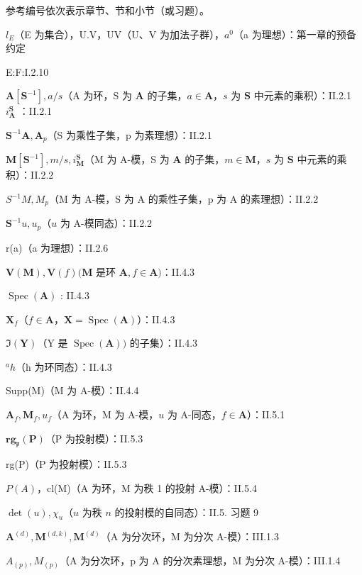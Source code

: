 
参考编号依次表示章节、节和小节（或习题）。

\(l_{E}\)（E 为集合），U.V，UV（U、V 为加法子群），\(a^{0}\)（a 为理想）：第一章的预备约定

E:F:I.2.10

\(\mathbf{A}[\mathbf{S}^{-1}], a / s\)（A 为环，S 为 \(\mathbf{A}\) 的子集，\(a \in \mathbf{A}\)，\(s\) 为 \(\mathbf{S}\) 中元素的乘积）：II.2.1 \(i_{\mathbf{A}}^{\mathbf{S}}\) ：II.2.1

\(\mathbf{S}^{-1}\mathbf{A},\mathbf{A}_{p}\)（S 为乘性子集，p 为素理想）：II.2.1

\(\mathbf{M}[\mathbf{S}^{-1}], m / s, i_{\mathbf{M}}^{\mathbf{S}}\)（M 为 A-模，S 为 \(\mathbf{A}\) 的子集，\(m \in \mathbf{M}\)，\(s\) 为 \(\mathbf{S}\) 中元素的乘积）：II.2.2

\(S^{-1}M, M_{p}\)（M 为 A-模，S 为 A 的乘性子集，p 为 A 的素理想）：II.2.2

\(\mathbf{S}^{-1}u, u_{p}\)（\(u\) 为 A-模同态）：II.2.2

r(a)（a 为理想）：II.2.6

\(\mathbf{V}(\mathbf{M}), \mathbf{V}(f) (\mathbf{M}\) 是环 \(\mathbf{A}, f \in \mathbf{A})\)：II.4.3

\(\operatorname {Spec}(\mathbf{A})\) : II.4.3

\(\mathbf{X}_f\)（\(f \in \mathbf{A}\)，\(\mathbf{X} = \operatorname{Spec}(\mathbf{A})\)）：II.4.3

\(\Im (\mathbf{Y})\)（Y 是 \(\operatorname {Spec}(\mathbf{A}))\) 的子集）：II.4.3

\(^{a}h\)（h 为环同态）：II.4.3

Supp(M)（M 为 A-模）：II.4.4

\(\mathbf{A}_f, \mathbf{M}_f, u_f\)（A 为环，M 为 A-模，\(u\) 为 A-同态，\(f \in \mathbf{A}\)）：II.5.1

\(\mathbf{rg}_{\mathfrak{p}}(\mathbf{P})\)（P 为投射模）：II.5.3

rg(P)（P 为投射模）：II.5.3

\(P(A)\)，cl(M)（A 为环，M 为秩 1 的投射 A-模）：II.5.4

\(\operatorname{det}(u), \chi_u\)（\(u\) 为秩 \(n\) 的投射模的自同态）：II.5. 习题 9

\(\mathbf{A}^{(d)}, \mathbf{M}^{(d,k)}, \mathbf{M}^{(d)}\)（A 为分次环，M 为分次 A-模）：III.1.3

\(A_{(p)}, M_{(p)}\)（A 为分次环，p 为 A 的分次素理想，M 为分次 A-模）：III.1.4

